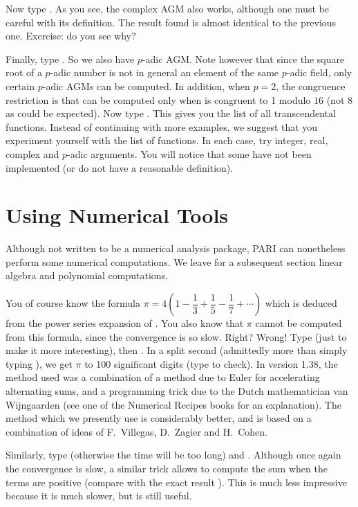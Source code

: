 Now type . As you see, the complex AGM also works,
although one must be careful with its definition. The result found is
almost identical to the previous one. Exercise: do you see why?

Finally, type . So we also have $p$-adic
AGM. Note however that since the square root of a $p$-adic number is not
in general an element of the same $p$-adic field,
only certain $p$-adic AGMs can be computed. In addition,
when $p=2$, the congruence restriction is that  can be computed
only when  is congruent to 1 modulo $16$ (not 8 as could be
expected).\smallskip
%
Now type . This gives you the list of all transcendental functions.
Instead of continuing with more examples, we suggest that you experiment
yourself with the list of functions. In each case, try integer, real, complex
and $p$-adic arguments. You will notice that some have not been implemented
(or do not have a reasonable definition).

\section{Using Numerical Tools}

 Although not written to be a numerical analysis package, PARI can
nonetheless perform some numerical computations. We leave for a subsequent
section linear algebra and polynomial computations.

You of course know the formula $\pi = 4(1-\dfrac13+\dfrac15-\dfrac17+\cdots)$
which is deduced from the power series expansion of . You also
know that $\pi$ cannot be computed from this formula, since the convergence
is so slow. Right? Wrong! Type  (just to make it more
interesting), then . In a split
second (admittedly more than simply typing ), we get $\pi$ to 100
significant digits (type  to check). In version 1.38, the method used
was a combination of a method due to Euler for accelerating alternating sums,
and a programming trick due to the Dutch mathematician van Wijngaarden (see
one of the Numerical Recipes books for an explanation). The method which we
presently use is considerably better, and is based on a combination of ideas of
F.~Villegas, D.~Zagier and H.~Cohen.

Similarly, type  (otherwise the time will be too long) and
. Although once again the convergence is slow, a
similar trick allows to compute the sum when the terms are positive (compare
with the exact result ). This is much less impressive because
it is much slower, but is still useful.

